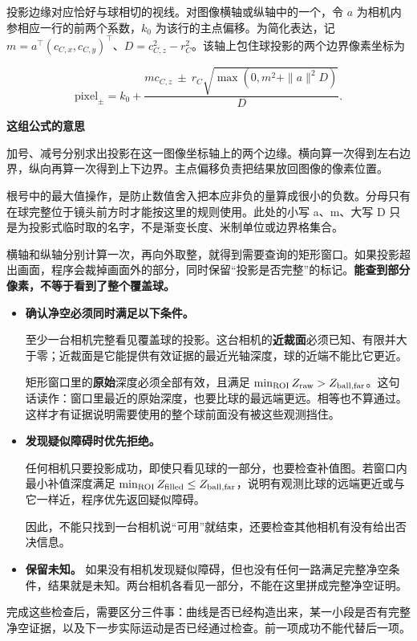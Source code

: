 \documentclass[12pt,a4paper]{article}
\numberwithin{equation}{topic}
\begin{document}
投影边缘对应恰好与球相切的视线。对图像横轴或纵轴中的一个，令 \(a\) 为相机内参相应一行的前两个系数，\(k_0\) 为该行的主点偏移。为简化表达，记 \(m=a^\top(c_{C,x},c_{C,y})^\top\)、\(D=c_{C,z}^2-r_C^2\)。该轴上包住球投影的两个边界像素坐标为

\begin{equation}
\label{eq:image-bounds}
\mathrm{pixel}_{\pm}=k_0+
\frac{m c_{C,z}\ \pm\ r_C\sqrt{\max(0,m^2+\|a\|^2D)}}{D}.
\end{equation}

\noindent\textbf{这组公式的意思}\par\nobreak
加号、减号分别求出投影在这一图像坐标轴上的两个边缘。横向算一次得到左右边界，纵向再算一次得到上下边界。主点偏移负责把结果放回图像的像素位置。

根号中的最大值操作，是防止数值舍入把本应非负的量算成很小的负数。分母只有在球完整位于镜头前方时才能按这里的规则使用。此处的小写 a、m、大写 D 只是为投影式临时取的名字，不是渐变长度、米制单位或边界格集合。


横轴和纵轴分别计算一次，再向外取整，就得到需要查询的矩形窗口。如果投影超出画面，程序会裁掉画面外的部分，同时保留“投影是否完整”的标记。\textbf{能查到部分像素，不等于看到了整个覆盖球。}

\begin{itemize}
\item \textbf{确认净空必须同时满足以下条件。}

至少一台相机完整看见覆盖球的投影。这台相机的\textbf{近裁面}必须已知、有限并大于零；近裁面是它能提供有效证据的最近光轴深度，球的近端不能比它更近。

矩形窗口里的\textbf{原始}深度必须全部有效，且满足 \(\min_{\rm ROI}Z_{\rm raw}>Z_{\rm ball,far}\)。这句话读作：窗口里最近的原始深度，也要比球的最远端更远。相等也不算通过。这样才有证据说明需要使用的整个球前面没有被这些观测挡住。
\item \textbf{发现疑似障碍时优先拒绝。}

任何相机只要投影成功，即使只看见球的一部分，也要检查补值图。若窗口内最小补值深度满足 \(\min_{\rm ROI}Z_{\rm filled}\le Z_{\rm ball,far}\)，说明有观测比球的远端更近或与它一样近，程序优先返回疑似障碍。

因此，不能只找到一台相机说“可用”就结束，还要检查其他相机有没有给出否决信息。
\item \textbf{保留未知。} 如果没有相机发现疑似障碍，但也没有任何一路满足完整净空条件，结果就是未知。两台相机各看见一部分，不能在这里拼成完整净空证明。
\end{itemize}

完成这些检查后，需要区分三件事：曲线是否已经构造出来，某一小段是否有完整净空证据，以及下一步实际运动是否已经通过检查。前一项成功不能代替后一项。
\end{document}
